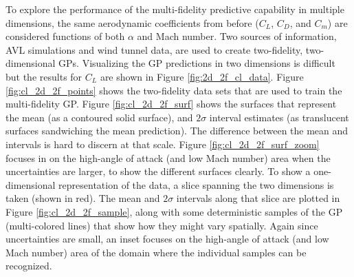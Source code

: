 To explore the performance of the multi-fidelity predictive capability in multiple dimensions, the same aerodynamic coefficients from before ($C_L$, $C_D$, and $C_m$) are considered functions of both $\alpha$ and Mach number. Two sources of information, AVL simulations and wind tunnel data, are used to create two-fidelity, two-dimensional GPs. Visualizing the GP predictions in two dimensions is difficult but the results for $C_L$ are shown in Figure \ref{fig:2d_2f_cl_data}. Figure \ref{fig:cl_2d_2f_points} shows the two-fidelity data sets that are used to train the multi-fidelity GP. Figure \ref{fig:cl_2d_2f_surf} shows the surfaces that represent the mean (as a contoured solid surface), and $2\sigma$ interval estimates (as translucent surfaces sandwiching the mean prediction). The difference between the mean and intervals is hard to discern at that scale. Figure \ref{fig:cl_2d_2f_surf_zoom} focuses in on the high-angle of attack (and low Mach number) area when the uncertainties are larger, to show the different surfaces clearly. To show a one-dimensional representation of the data, a slice spanning the two dimensions is taken (shown in red). The mean and $2\sigma$ intervals along that slice are plotted in Figure \ref{fig:cl_2d_2f_sample}, along with some deterministic samples of the GP (multi-colored lines) that show how they might vary spatially. Again since uncertainties are small, an inset focuses on the high-angle of attack (and low Mach number) area of the domain where the individual samples can be recognized.

